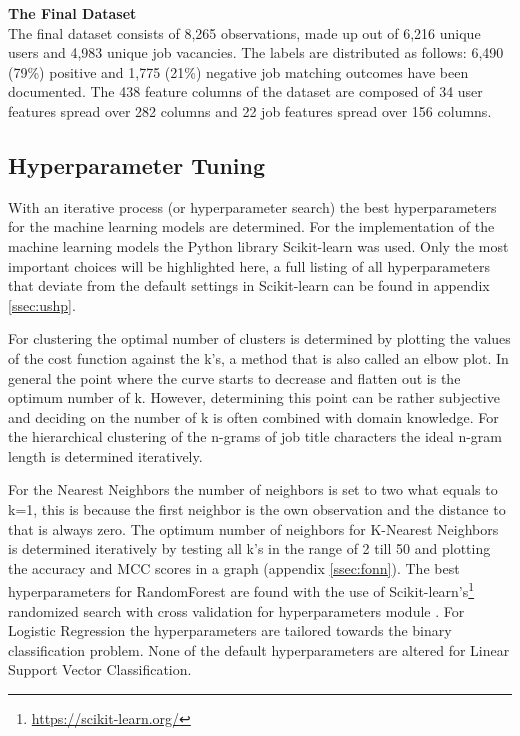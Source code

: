 \noindent
\textbf{The Final Dataset}\\
The final dataset consists of 8,265 observations, made up out of 6,216 unique users and 4,983 unique job vacancies. 
The labels are distributed as follows: 6,490 (79\%) positive and 1,775 (21\%) negative job matching outcomes have been documented. 
The 438 feature columns of the dataset are composed of 34 user features spread over 282 columns and 22 job features spread over 156 columns. 

\subsection{Hyperparameter Tuning}
\label{ssec:ht}
With an iterative process (or hyperparameter search) the best hyperparameters for the machine learning models are determined. 
For the implementation of the machine learning models the Python library Scikit-learn was used.
Only the most important choices will be highlighted here, a full listing of all hyperparameters that deviate from the default settings in Scikit-learn can be found in appendix \ref{ssec:ushp}.

For clustering the optimal number of clusters is determined by plotting the values of the cost function against the k’s, a method that is also called an elbow plot.
In general the point where the curve starts to decrease and flatten out is the optimum number of k. 
However, determining this point can be rather subjective and deciding on the number of k is often combined with domain knowledge.
For the hierarchical clustering of the n-grams of job title characters the ideal n-gram length is determined iteratively. 

For the Nearest Neighbors the number of neighbors is set to two what equals to k=1, this is because the first neighbor is the own observation and the distance to that is always zero.
The optimum number of neighbors for K-Nearest Neighbors is determined iteratively by testing all k’s in the range of 2 till 50 and plotting the accuracy and MCC scores in a graph (appendix \ref{ssec:fonn}).
The best hyperparameters for RandomForest are found with the use of Scikit-learn’s\footnote{\url{https://scikit-learn.org/}} randomized search with cross validation for hyperparameters module \cite{ bergstra2012random}.
For Logistic Regression the hyperparameters are tailored towards the binary classification problem. 
None of the default hyperparameters are altered for Linear Support Vector Classification. 

